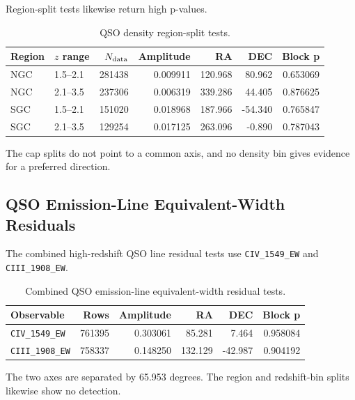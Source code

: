 \documentclass[11pt]{article}
\begin{document}
Region-split tests likewise return high p-values.

\begin{table}[h]
\centering
\caption{QSO density region-split tests.}
\begin{tabular}{llrrrrr}
\toprule
Region & $z$ range & $N_{\rm data}$ & Amplitude & RA & DEC & Block p \\
\midrule
NGC & 1.5--2.1 & 281438 & 0.009911 & 120.968 & 80.962 & 0.653069 \\
NGC & 2.1--3.5 & 237306 & 0.006319 & 339.286 & 44.405 & 0.876625 \\
SGC & 1.5--2.1 & 151020 & 0.018968 & 187.966 & -54.340 & 0.765847 \\
SGC & 2.1--3.5 & 129254 & 0.017125 & 263.096 & -0.890 & 0.787043 \\
\bottomrule
\end{tabular}
\end{table}

The cap splits do not point to a common axis, and no density bin gives evidence for a preferred direction.

\subsection{QSO Emission-Line Equivalent-Width Residuals}

The combined high-redshift QSO line residual tests use \texttt{CIV\_1549\_EW} and \texttt{CIII\_1908\_EW}.

\begin{table}[h]
\centering
\caption{Combined QSO emission-line equivalent-width residual tests.}
\begin{tabular}{lrrrrr}
\toprule
Observable & Rows & Amplitude & RA & DEC & Block p \\
\midrule
\texttt{CIV\_1549\_EW} & 761395 & 0.303061 & 85.281 & 7.464 & 0.958084 \\
\texttt{CIII\_1908\_EW} & 758337 & 0.148250 & 132.129 & -42.987 & 0.904192 \\
\bottomrule
\end{tabular}
\end{table}

The two axes are separated by 65.953 degrees. The region and redshift-bin splits likewise show no detection.
\end{document}
